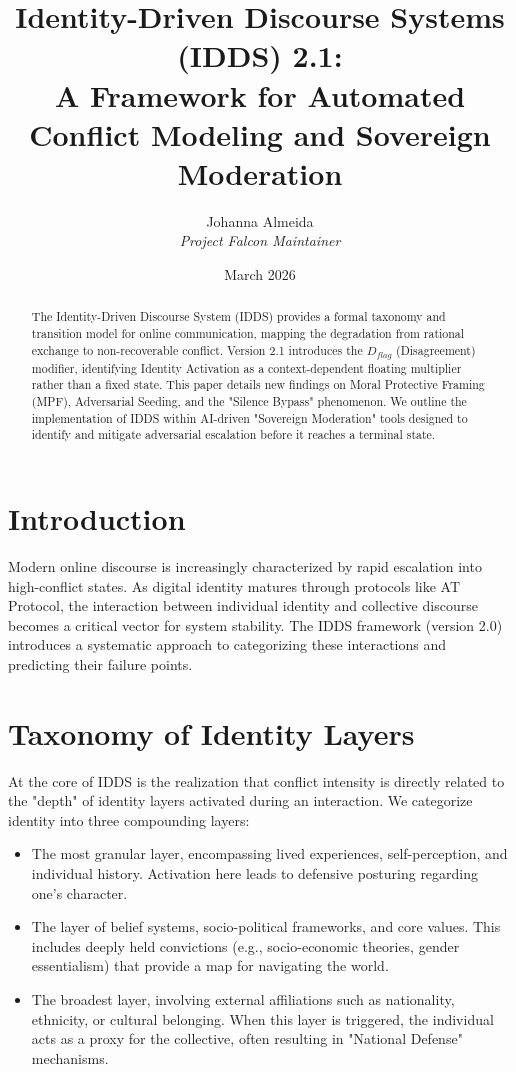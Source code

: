 \documentclass[11pt,a4paper]{article}
\title{\textbf{Identity-Driven Discourse Systems (IDDS) 2.1: \\ A Framework for Automated Conflict Modeling and Sovereign Moderation}}
\author{Johanna Almeida \\ \textit{Project Falcon Maintainer}}
\date{March 2026}
\begin{document}
\maketitle

\begin{abstract}
The Identity-Driven Discourse System (IDDS) provides a formal taxonomy and transition model for online communication, mapping the degradation from rational exchange to non-recoverable conflict. Version 2.1 introduces the $D_{flag}$ (Disagreement) modifier, identifying Identity Activation as a context-dependent floating multiplier rather than a fixed state. This paper details new findings on Moral Protective Framing (MPF), Adversarial Seeding, and the "Silence Bypass" phenomenon. We outline the implementation of IDDS within AI-driven "Sovereign Moderation" tools designed to identify and mitigate adversarial escalation before it reaches a terminal state.
\end{abstract}

\section{Introduction}
Modern online discourse is increasingly characterized by rapid escalation into high-conflict states. As digital identity matures through protocols like AT Protocol, the interaction between individual identity and collective discourse becomes a critical vector for system stability. The IDDS framework (version 2.0) introduces a systematic approach to categorizing these interactions and predicting their failure points.

\section{Taxonomy of Identity Layers}
At the core of IDDS is the realization that conflict intensity is directly related to the "depth" of identity layers activated during an interaction. We categorize identity into three compounding layers:

\begin{itemize}[leftmargin=1.5in]
    \item[\textbf{Personal Identity}] The most granular layer, encompassing lived experiences, self-perception, and individual history. Activation here leads to defensive posturing regarding one's character.
    \item[\textbf{Ideological Identity}] The layer of belief systems, socio-political frameworks, and core values. This includes deeply held convictions (e.g., socio-economic theories, gender essentialism) that provide a map for navigating the world.
    \item[\textbf{Group Identity}] The broadest layer, involving external affiliations such as nationality, ethnicity, or cultural belonging. When this layer is triggered, the individual acts as a proxy for the collective, often resulting in "National Defense" mechanisms.
\end{itemize}
\end{document}
